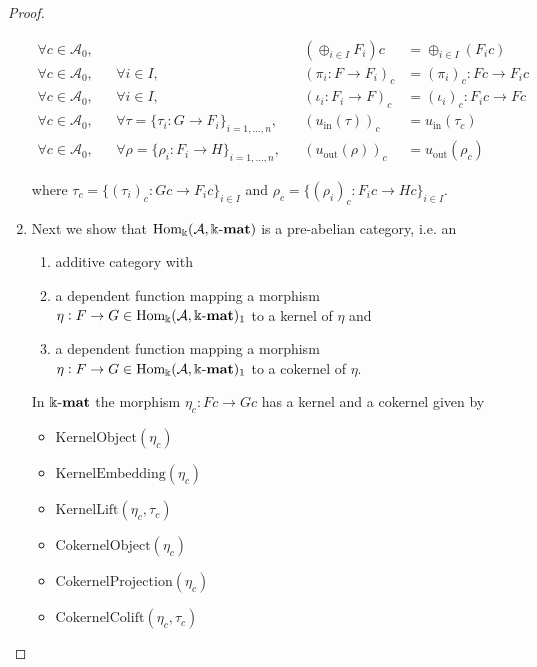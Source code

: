 \begin{proof}
\begin{enumerate}
\begin{subproof}[Proof of (ii)]
\begin{align*}
\forall c \in \mathcal{A}_{0},&& &&  (\oplus_{i \in I} F_{i}) c &= \oplus_{i \in I} (F_{i} c) \\
\forall c \in \mathcal{A}_{0},&& \forall i \in I,&& (\pi_{i} : F \rightarrow F_{i})_{c} &= (\pi_{i})_{c} : Fc \rightarrow F_{i} c \\
\forall c \in \mathcal{A}_{0},&& \forall i \in I,&& (\iota_{i} : F_{i} \rightarrow F)_{c} &= (\iota_{i})_{c} : F_{i} c \rightarrow Fc \\
\forall c \in \mathcal{A}_{0},&& \forall \tau = \{ \tau_{i} : G \rightarrow F_{i} \}_{i = 1,\dots,n},&&
(u_{\mathrm{in}}(\tau))_{c} &= u_{\mathrm{in}}(\tau_{c}) \\
\forall c \in \mathcal{A}_{0},&& \forall \rho = \{ \rho_{i} : F_{i} \rightarrow H \}_{i = 1,\dots,n},&&
(u_{\mathrm{out}}(\rho))_{c} &= u_{\mathrm{out}}(\rho_{c})
\end{align*}

where $\tau_{c} = \{ (\tau_{i})_{c} : Gc \rightarrow F_{i}c \}_{i \in I}$ and $\rho_{c} = \{ (\rho_{i})_{c} : F_{i} c \rightarrow Hc \}_{i \in I}$.

\end{subproof}

\item Next we show that $\mathrm{Hom_{\Bbbk}}(\mathcal{A},\Bbbk\textnormal{-}\mathbf{mat})$ is a pre-abelian category, i.e. an
\begin{enumerate}
\renewcommand{\labelenumii}{(\roman{enumii})}
\item additive category with
\item a dependent function mapping a morphism $\eta : F \rightarrow G \in \mathrm{Hom_{\Bbbk}}(\mathcal{A},\Bbbk\textnormal{-}\mathbf{mat})_{1}$ to a kernel of $\eta$ and
\item a dependent function mapping a morphism $\eta : F \rightarrow G \in \mathrm{Hom_{\Bbbk}}(\mathcal{A},\Bbbk\textnormal{-}\mathbf{mat})_{1}$ to a cokernel of $\eta$.
\end{enumerate}
\begin{subproof}
In $\Bbbk\textnormal{-}\mathbf{mat}$ the morphism $\eta_{c} : Fc \rightarrow Gc$ has a kernel and a cokernel given by
\begin{itemize}
\item $\mathrm{KernelObject}(\eta_{c})$
\item $\mathrm{KernelEmbedding}(\eta_{c})$
\item $\mathrm{KernelLift}(\eta_{c},\tau_{c})$
\item $\mathrm{CokernelObject}(\eta_{c})$
\item $\mathrm{CokernelProjection}(\eta_{c})$
\item $\mathrm{CokernelColift}(\eta_{c},\tau_{c})$
\end{itemize}
\end{subproof}


\end{enumerate}
\end{proof}
